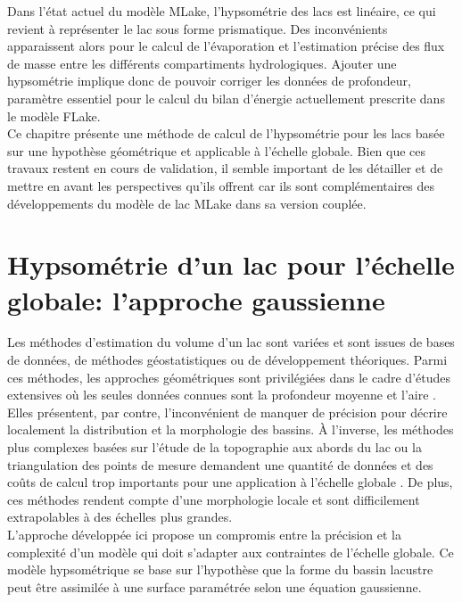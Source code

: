 Dans l'état actuel du modèle MLake, l'hypsométrie des lacs est linéaire, ce qui revient à représenter le lac sous forme prismatique. Des inconvénients apparaissent alors pour le calcul de l'évaporation et l'estimation précise des flux de masse entre les différents compartiments hydrologiques. Ajouter une hypsométrie implique donc de pouvoir corriger les données de profondeur, paramètre essentiel pour le calcul du bilan d'énergie actuellement prescrite dans le modèle FLake.\\

Ce chapitre présente une méthode de calcul de l'hypsométrie pour les lacs basée sur une hypothèse géométrique et applicable à l'échelle globale. Bien que ces travaux restent en cours de validation, il semble important de les détailler et de mettre en avant les perspectives qu'ils offrent car ils sont complémentaires des développements du modèle de lac MLake dans sa version couplée.

\section{{\selectfont Hypsométrie d'un lac pour l'échelle globale: l'approche gaussienne}}

Les méthodes d'estimation du volume d'un lac sont variées et sont issues de bases de données, de méthodes géostatistiques ou de développement théoriques. Parmi ces méthodes, les approches géométriques sont privilégiées dans le cadre d'études extensives où les seules données connues sont la profondeur moyenne et l'aire \citep{li2019,hayashi2000}. Elles présentent, par contre, l'inconvénient de manquer de précision pour décrire localement la distribution et la morphologie des bassins. À l'inverse, les méthodes plus complexes basées sur l'étude de la topographie aux abords du lac \citep{heathcote2015} ou la triangulation des points de mesure \citep{hollister2010} demandent une quantité de données et des coûts de calcul trop importants pour une application à l'échelle globale \citep{oliver2016}. De plus, ces méthodes rendent compte d'une morphologie locale et sont difficilement extrapolables à des échelles plus grandes. \\

L'approche développée ici propose un compromis entre la précision et la complexité d'un modèle qui doit s'adapter aux contraintes de l'échelle globale. Ce modèle hypsométrique se base sur l'hypothèse que la forme du bassin lacustre peut être assimilée à une surface paramétrée selon une équation gaussienne.\\

